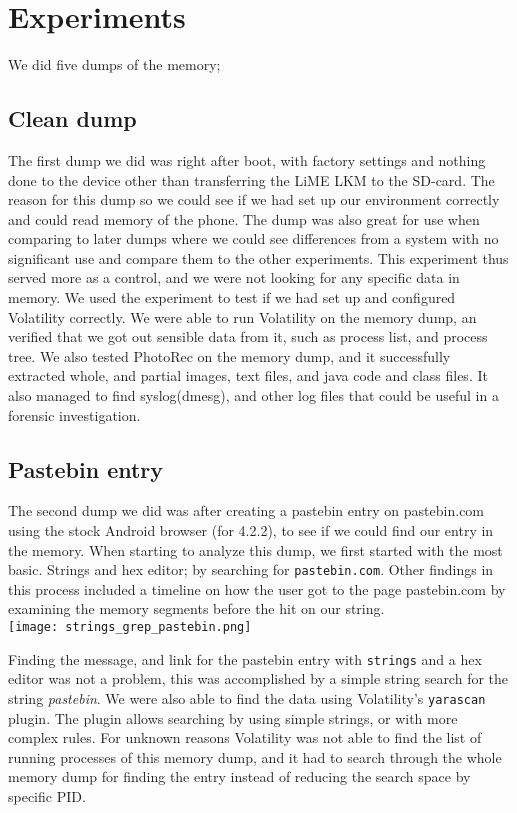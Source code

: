 \section{Experiments}
We did five dumps of the memory;
  \subsection{Clean dump}
The first dump we did was right after boot, with factory settings and nothing 
done to the device other than transferring the LiME LKM to the SD-card. The 
reason for this dump so we could see if we had set up our environment correctly 
and could read memory of the phone. The dump was also great for use when 
comparing to later dumps where we could see differences from a system with no 
significant use and compare them to the other experiments. This experiment
thus served more as a control, and we were not looking for any specific data in
memory. We used the experiment to test if we had set up and configured 
Volatility correctly. We were able to run Volatility on the memory dump, an 
verified that we got out sensible data from it, such as process list, and 
process tree. We also tested PhotoRec on the memory dump, and it successfully
extracted whole, and partial images, text files, and java code and class files.
It also managed to find syslog(dmesg), and other log files that could be useful
in a forensic investigation.
  
\subsection{Pastebin entry}
The second dump we did was after creating a pastebin entry on pastebin.com using
the stock Android browser (for 4.2.2), to see if we could find our entry in the 
memory. When starting to analyze this dump, we first started with the most basic.
Strings and hex editor; by searching for \texttt{pastebin.com}. Other findings in
this process included a timeline on how the user got to the page pastebin.com by 
examining the memory segments before the hit on our string.\\

\texttt{[image: strings\_grep\_pastebin.png]}


Finding the message, and link for the pastebin entry with \texttt{strings} and a
hex editor was not a problem, this was accomplished by a simple string search for
the string \textit{pastebin}. We were also able to find the data using Volatility's
\texttt{yarascan} plugin. The plugin allows searching by using simple strings,
or with more complex rules. For unknown reasons Volatility was not able to find
the list of running processes of this memory dump, and it had to search through 
the whole memory dump for finding the entry instead of reducing the search space 
by specific PID. 
  
